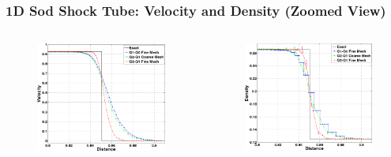 \documentclass[8pt,xcolor=svgnames]{beamer}
\begin{document}
\begin{frame}
 \frametitle{1D Sod Shock Tube: Velocity and Density (Zoomed View)}
 \begin{columns}
  \begin{column}{0.4\textwidth}
   \begin{figure}[h!]
    \centering
    \includegraphics[width=1.0\textwidth,keepaspectratio=true]{./Images/SodVelocityZoom_Compare.png}
    \end{figure}
  \end{column}
  \begin{column}{0.4\textwidth}
   \begin{figure}[h!]
    \centering
    \includegraphics[width=1.0\textwidth,keepaspectratio=true]{./Images/SodDensityZoom_Compare.png}

\end{figure}
\end{column}
\end{columns}
\end{frame}
\end{document}

